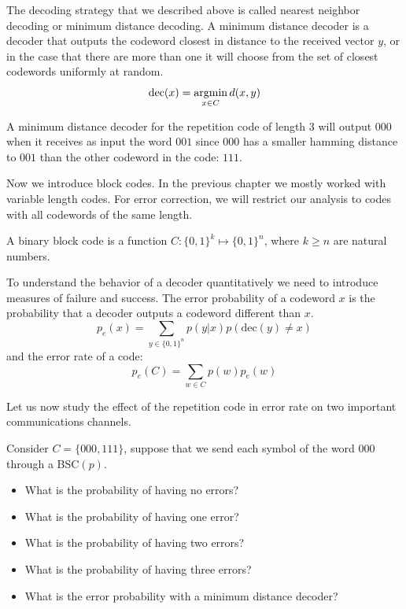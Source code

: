 The decoding strategy that we described above is called nearest neighbor decoding or minimum distance decoding. A minimum distance decoder is a decoder that outputs the codeword closest in distance to the received vector $y$, or in the case that there are more than one it will choose from the set of closest codewords uniformly at random.
\begin{equation}
\text{dec}(x) = \operatorname*{argmin}_{x\in C}d(x,y)
\end{equation}
\begin{example}
A minimum distance decoder for the repetition code of length 3 will output 000 when it receives as input the word $001$ since $000$ has a smaller hamming distance to $001$ than the other codeword in the code: $111$.
\end{example}

Now we introduce block codes. In the previous chapter we mostly worked with variable length codes. For error correction, we will restrict our analysis to codes with all codewords of the same length.
\begin{definition}
A binary block code is a function $C:\{0,1\}^k\mapsto \{0,1\}^n$, where $k\geq n$ are natural numbers.
\end{definition}

To understand the behavior of a decoder quantitatively we need to introduce measures of failure and success. The error probability of a codeword $x$ is the probability that a decoder outputs a codeword different than $x$. 
\begin{equation}
p_e(x)=\sum_{y\in \{0,1\}^n}p(y|x)p(\text{dec}(y)\neq x)
\end{equation}
and the error rate of a code:
\begin{equation}
p_e(C)=\sum_{w\in C}p(w)p_e(w)
\end{equation}

Let us now study the effect of the repetition code in error rate on two important communications channels.

\begin{exercise}
\label{ex:bsc}
Consider $C=\{000,111\}$, suppose that we send each symbol of the word 000 through a BSC$(p)$.
\begin{itemize}
\item What is the probability of having no errors?
\item What is the probability of having one error?
\item What is the probability of having two errors?
\item What is the probability of having three errors?
\item What is the error probability with a minimum distance decoder?
\end{itemize}
\end{exercise}

